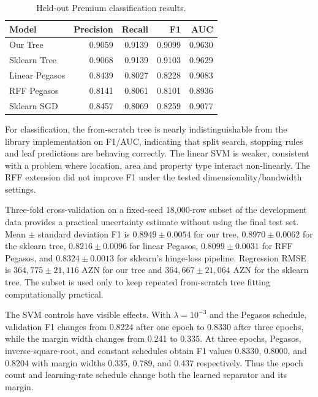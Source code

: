 \documentclass[10pt,twocolumn,a4paper]{article}
\begin{document}
\begin{table}[t]
\centering\scriptsize
\caption{Held-out Premium classification results.}
\label{tab:clsresults}
\begin{tabular}{@{}lrrrr@{}}
\toprule
Model & Precision & Recall & F1 & AUC \\
\midrule
Our Tree & 0.9059 & 0.9139 & 0.9099 & 0.9630 \\
Sklearn Tree & 0.9068 & 0.9139 & 0.9103 & 0.9629 \\
Linear Pegasos & 0.8439 & 0.8027 & 0.8228 & 0.9083 \\
RFF Pegasos & 0.8141 & 0.8061 & 0.8101 & 0.8936 \\
Sklearn SGD & 0.8457 & 0.8069 & 0.8259 & 0.9077 \\
\bottomrule
\end{tabular}
\end{table}

For classification, the from-scratch tree is nearly indistinguishable from the library implementation on F1/AUC, indicating that split search, stopping rules and leaf predictions are behaving correctly. The linear SVM is weaker, consistent with a problem where location, area and property type interact non-linearly. The RFF extension did not improve F1 under the tested dimensionality/bandwidth settings.

Three-fold cross-validation on a fixed-seed 18,000-row subset of the development data provides a practical uncertainty estimate without using the final test set. Mean $\pm$ standard deviation F1 is $0.8949\pm0.0054$ for our tree, $0.8970\pm0.0062$ for the sklearn tree, $0.8216\pm0.0096$ for linear Pegasos, $0.8099\pm0.0031$ for RFF Pegasos, and $0.8324\pm0.0013$ for sklearn's hinge-loss pipeline. Regression RMSE is $364,775\pm21,116$ AZN for our tree and $364,667\pm21,064$ AZN for the sklearn tree. The subset is used only to keep repeated from-scratch tree fitting computationally practical.

The SVM controls have visible effects. With $\lambda=10^{-3}$ and the Pegasos schedule, validation F1 changes from 0.8224 after one epoch to 0.8330 after three epochs, while the margin width changes from 0.241 to 0.335. At three epochs, Pegasos, inverse-square-root, and constant schedules obtain F1 values 0.8330, 0.8000, and 0.8204 with margin widths 0.335, 0.789, and 0.437 respectively. Thus the epoch count and learning-rate schedule change both the learned separator and its margin.
\end{document}
